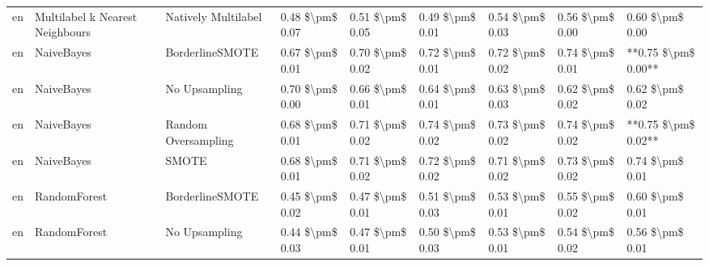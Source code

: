\begin{tabular}{lllllllll}
      en & Multilabel k Nearest Neighbours &           Natively Multilabel &     0.48 \$\textbackslash pm\$ 0.07 &           0.51 \$\textbackslash pm\$ 0.05 &       0.49 \$\textbackslash pm\$ 0.01 &        0.54 \$\textbackslash pm\$ 0.03 &                         0.56 \$\textbackslash pm\$ 0.00 &     0.60 \$\textbackslash pm\$ 0.00 \\
      en &                      NaiveBayes &               BorderlineSMOTE &     0.67 \$\textbackslash pm\$ 0.01 &           0.70 \$\textbackslash pm\$ 0.02 &       0.72 \$\textbackslash pm\$ 0.01 &        0.72 \$\textbackslash pm\$ 0.02 &                         0.74 \$\textbackslash pm\$ 0.01 & **0.75 \$\textbackslash pm\$ 0.00** \\
      en &                      NaiveBayes &                 No Upsampling &     0.70 \$\textbackslash pm\$ 0.00 &           0.66 \$\textbackslash pm\$ 0.01 &       0.64 \$\textbackslash pm\$ 0.01 &        0.63 \$\textbackslash pm\$ 0.03 &                         0.62 \$\textbackslash pm\$ 0.02 &     0.62 \$\textbackslash pm\$ 0.02 \\
      en &                      NaiveBayes &           Random Oversampling &     0.68 \$\textbackslash pm\$ 0.01 &           0.71 \$\textbackslash pm\$ 0.02 &       0.74 \$\textbackslash pm\$ 0.02 &        0.73 \$\textbackslash pm\$ 0.02 &                         0.74 \$\textbackslash pm\$ 0.02 & **0.75 \$\textbackslash pm\$ 0.02** \\
      en &                      NaiveBayes &                         SMOTE &     0.68 \$\textbackslash pm\$ 0.01 &           0.71 \$\textbackslash pm\$ 0.02 &       0.72 \$\textbackslash pm\$ 0.02 &        0.71 \$\textbackslash pm\$ 0.02 &                         0.73 \$\textbackslash pm\$ 0.02 &     0.74 \$\textbackslash pm\$ 0.01 \\
      en &                    RandomForest &               BorderlineSMOTE &     0.45 \$\textbackslash pm\$ 0.02 &           0.47 \$\textbackslash pm\$ 0.01 &       0.51 \$\textbackslash pm\$ 0.03 &        0.53 \$\textbackslash pm\$ 0.01 &                         0.55 \$\textbackslash pm\$ 0.02 &     0.60 \$\textbackslash pm\$ 0.01 \\
      en &                    RandomForest &                 No Upsampling &     0.44 \$\textbackslash pm\$ 0.03 &           0.47 \$\textbackslash pm\$ 0.01 &       0.50 \$\textbackslash pm\$ 0.03 &        0.53 \$\textbackslash pm\$ 0.01 &                         0.54 \$\textbackslash pm\$ 0.02 &     0.56 \$\textbackslash pm\$ 0.01 \\

\end{tabular}
